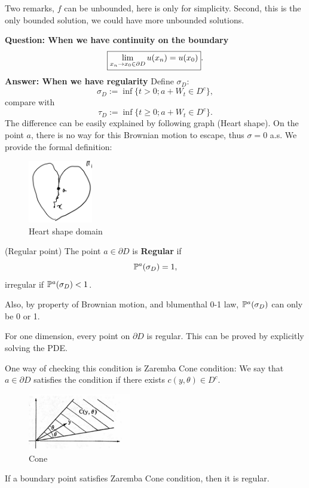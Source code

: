 \begin{rem}
Two remarks, $f$ can be unbounded, here is only for simplicity. Second, this is the only bounded solution, we could have more unbounded solutions.
\end{rem}
\textbf{Question: When we have continuity on the boundary}
\begin{equation*}\boxed{
    \lim\limits_{x_n \rightarrow x_0 \in \partial D} u(x_n) = u(x_0)}.
\end{equation*}
\textbf{Answer: When we have regularity}
Define $\sigma_D$:
\begin{equation*}
    \sigma_D := \inf\{t>0; a+W_t \in D^c\},
\end{equation*} compare with
\begin{equation*}
    \tau_D := \inf\{t\geq 0; a+W_t \in D^c\}.
\end{equation*} 
The difference can be easily explained by following graph (Heart shape). On the point $a$, there is no way for this Brownian motion to escape, thus $\sigma = 0$ a.s. We provide the formal definition:
\begin{figure}[ht]
    \centering
    \includegraphics[width=0.25\textwidth]{heart.png}
    \caption{Heart shape domain}
    \label{fig:heart}
\end{figure}
\begin{dfn}{(Regular point)}
The point $a\in \partial D$ is \textbf{Regular} if 
\begin{equation*}
    \mathbb{P}^a(\sigma_D) = 1,
\end{equation*} irregular if $\mathbb{P}^a(\sigma_D) < 1$.
\end{dfn}

Also, by property of Brownian motion, and blumenthal 0-1 law, $\mathbb{P}^a(\sigma_D)$ can only be 0 or 1.

\begin{example}
For one dimension, every point on $\partial D$ is regular. This can be proved by explicitly solving the PDE.
\end{example}

One way of checking this condition is Zaremba Cone condition:
We say that $a\in \partial D$ satisfies the condition if there exists $c(y, \theta) \in D^c$.
\begin{figure}[ht]
    \centering
    \includegraphics[width=0.4\textwidth]{cone.png}
    \caption{Cone}
\end{figure}
\begin{thm}
If a boundary point satisfies Zaremba Cone condition, then it is regular.
\end{thm}


